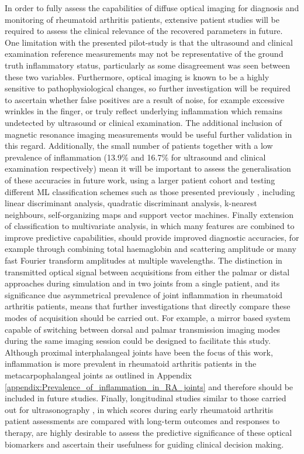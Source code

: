 \documentclass[twoside]{bhamthesis}
\theoremstyle{definition}
\begin{document}
In order to fully assess the capabilities of diffuse optical imaging for diagnosis and monitoring of rheumatoid arthritis patients, extensive patient studies will be required to assess the clinical relevance of the recovered parameters in future. One limitation with the presented pilot-study is that the ultrasound and clinical examination reference measurements may not be representative of the ground truth inflammatory status, particularly as some disagreement was seen between these two variables. Furthermore, optical imaging is known to be a highly sensitive to pathophysiological changes, so further investigation will be required to ascertain whether false positives are a result of noise, for example excessive wrinkles in the finger, or truly reflect underlying inflammation which remains undetected by ultrasound or clinical examination. The additional inclusion of magnetic resonance imaging measurements would be useful further validation in this regard. Additionally, the small number of patients together with a low prevalence of inflammation (13.9\% and 16.7\% for ultrasound and clinical examination respectively) mean it will be important to assess the generalisation of these accuracies in future work, using a larger patient cohort and testing different ML classification schemes such as those presented previously \cite{montejo2013computer2,schwaighofer2003classification}, 
including linear discriminant analysis, quadratic discriminant analysis, k-nearest neighbours, self-organizing maps and support vector machines. Finally extension of classification to multivariate analysis, in which many features are combined to improve predictive capabilities, should provide improved diagnostic accuracies, for example through combining total haemaglobin and scattering amplitude or many fast Fourier transform amplitudes at multiple wavelengths. The distinction in transmitted optical signal between acquisitions from either the palmar or distal approaches during simulation and in two joints from a single patient, and its significance due asymmetrical prevalence of joint inflammation in rheumatoid arthritis patients, means that further investigations that directly compare these modes of acquisition should be carried out. For example, a mirror based system capable of switching between dorsal and palmar transmission imaging modes during the same imaging session could be designed to facilitate this study. Although proximal interphalangeal joints have been the focus of this work, inflammation is more prevalent in rheumatoid arthritis patients in the metacarpophalangeal joints as outlined in Appendix \ref{appendix:Prevalence_of_inflammation_in_RA_joints} and therefore should be included in future studies. Finally, longitudinal studies similar to those carried out for ultrasonography \cite{filer2011utility}, in which scores during early rheumatoid arthritis patient assessments are compared with long-term outcomes and responses to therapy, are highly desirable to assess the predictive significance of these optical biomarkers and ascertain their usefulness for guiding clinical decision making. 
\end{document}
